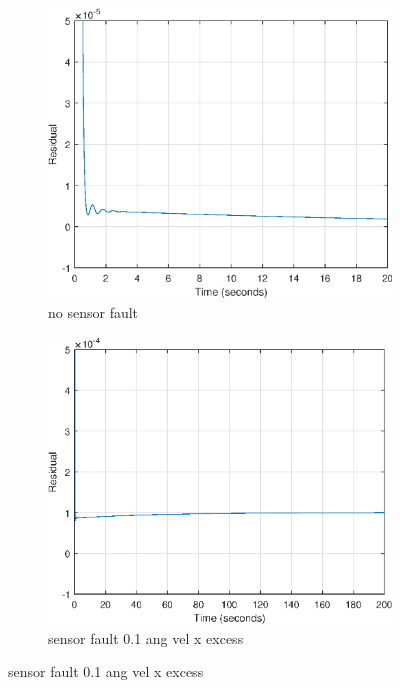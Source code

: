 \begin{figure}[H]
	\begin{subfigure}{0.5\linewidth}
			\centering
		\includegraphics[width=1\linewidth]{figures/nosensfault_res}
		\caption{no sensor fault }
		\label{fig:nosensfault_res}
	\end{subfigure}
		\begin{subfigure}{0.5\linewidth}
	\centering
\includegraphics[width=1\linewidth]{figures/sensfault_res}
\caption{sensor fault 0.1 ang vel x excess}
\label{fig:sensfault_res}	
	\end{subfigure}
\end{figure}


